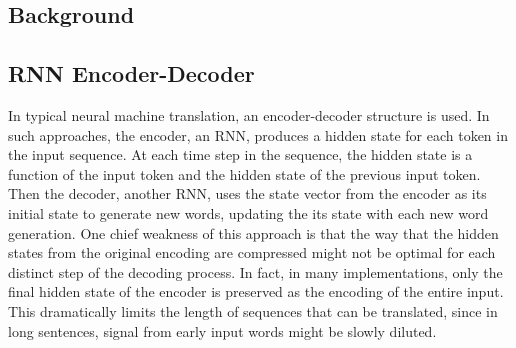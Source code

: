 \documentclass[letterpaper, 10pt]{article}
\begin{document}
\begin{multicols}{2}

\section{Background}
\subsection{RNN Encoder-Decoder}

In typical neural machine translation, an encoder-decoder structure is used.
In such approaches, the encoder, an RNN, produces a hidden state for each token in the input
sequence.
At each time step in the sequence, the hidden state is a function of the input token and the hidden
state of the previous input token.
Then the decoder, another RNN, uses the state vector from the encoder as its initial state to
generate new words, updating the its state with each new word generation.
One chief weakness of this approach is that the way that the hidden states from the original
encoding are compressed might not be optimal for each distinct step of the decoding process.
In fact, in many implementations, only the final hidden state of the encoder is preserved as the
encoding of the entire input.
This dramatically limits the length of sequences that can be translated, since in long sentences,
signal from early input words might be slowly diluted.


\end{multicols}
\end{document}
